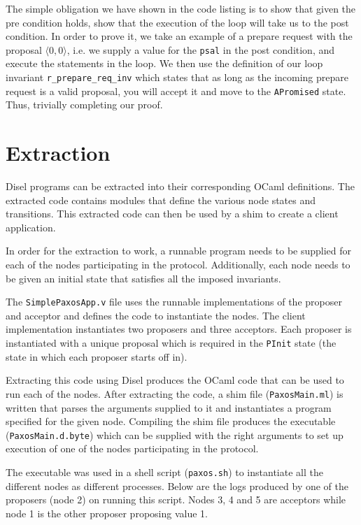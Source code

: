 The simple obligation we have shown in the code listing is to show that
given the pre condition holds, show that the execution of the loop will take
us to the post condition.
In order to prove it, we take an example of a prepare request with the proposal
$\langle 0, 0 \rangle$, i.e. we supply a value for the \texttt{psal} in
the post condition, and execute the statements in the loop.
We then use the definition of our loop invariant
\texttt{r\_prepare\_req\_inv} which states that as long as the incoming prepare
request is a valid proposal, you will accept it and move to the \texttt{APromised}
state. Thus, trivially completing our proof.

\section{Extraction}
Disel programs can be extracted into their corresponding OCaml definitions.
The extracted code contains modules that define the various node states
and transitions. This extracted code can then be used by a shim to create a
client application.

In order for the extraction to work, a runnable program needs to be supplied for each of
the nodes participating in the protocol. Additionally, each node needs to
be given an initial state that satisfies all the imposed invariants.

The \texttt{SimplePaxosApp.v} file uses the runnable implementations of
the proposer and acceptor and defines the code to instantiate the nodes.
The client implementation instantiates two proposers and three acceptors.
Each proposer is instantiated with a unique proposal which is required in the
\texttt{PInit} state (the state in which each proposer starts off in).

Extracting this code using Disel produces the OCaml code
that can be used to run each of the nodes. After extracting the code,
a shim file (\texttt{PaxosMain.ml}) is written that parses the arguments
supplied to it and instantiates a program specified
for the given node. Compiling the shim file produces the executable (\texttt{PaxosMain.d.byte})
which can be supplied with the right arguments to set up execution of one
of the nodes participating in the protocol.

The executable was used in a shell script (\texttt{paxos.sh})
to instantiate all the different nodes as different processes.
Below are the logs produced by one of the
proposers (node 2) on running this script. Nodes 3, 4 and 5 are acceptors while
node 1 is the other proposer proposing value 1.


